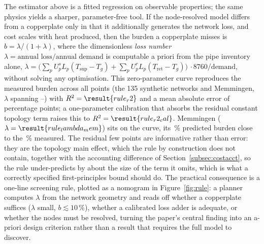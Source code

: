 \documentclass[a4paper,fleqn]{cas-sc}
\begin{document}
The estimator above is a fitted regression on observable properties; the same physics yields a
sharper, parameter-free tool. If the node-resolved model differs from a copperplate only in that
it additionally generates the network loss, and cost scales with heat produced, then the burden a
copperplate misses is $b=\lambda/(1+\lambda)$, where the dimensionless \emph{loss number}
$\lambda=\text{annual loss}/\text{annual demand}$ is computable a priori from the pipe inventory
alone, $\lambda=\big(\sum_p U^{s}_p L_p (T_{\text{sup}}-T_g)+\sum_p U^{r}_p L_p
(T_{\text{ret}}-T_g)\big)\,\cdot 8760/\text{demand}$, without solving any optimisation. This
zero-parameter curve reproduces the measured burden across all  points (the
135 synthetic networks and Memmingen, $\lambda$ spanning
--) with $R^2=\result{rule_r2}$ and a mean
absolute error of  percentage points; a one-parameter calibration that
absorbs the residual constant topology term raises this to $R^2=\result{rule_r2_cal}$. Memmingen
($\lambda=\result{rule_lambda_mem}$) sits on the curve, its \,\% predicted
burden close to the \,\% measured. The residual few points are
informative rather than error: they are the topology main effect, which the rule by
construction does not contain, together with the accounting difference of
Section~\ref{subsec:costacct}, so the rule under-predicts by about the size of the term it
omits, which is what a correctly specified first-principles bound should do. The practical
consequence is a
one-line screening rule, plotted as a nomogram in Figure~\ref{fig:rule}: a planner computes
$\lambda$ from the network geometry and reads off whether a copperplate suffices ($\lambda$ small,
$b\lesssim10$\,\%), whether a calibrated loss adder is adequate, or whether the nodes must be
resolved, turning the paper's central finding into an a-priori design criterion rather than a
result that requires the full model to discover.


\end{document}
